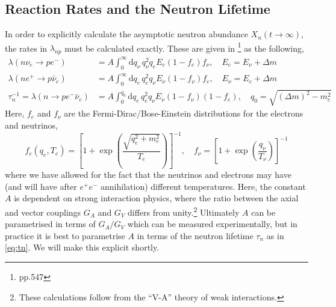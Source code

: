 \documentclass[11pt]{article}
\numberwithin{equation}{section}
\numberwithin{figure}{section}
\numberwithin{table}{section}
\begin{document}
\subsection{Reaction Rates and the Neutron Lifetime}


In order to explicitly calculate the asymptotic neutron abundance $X_n(t \rightarrow \infty)$, the rates in $\lambda_{np}$ must be calculated exactly. These are given in \citet{Weinberg:1972kfs}\footnote{pp.547} as the following,
\begin{align}
\lambda(n\nu_e \rightarrow p e^{-}) &= A \int_{0}^{\infty}{\mathrm{d}q_\nu \, q_\nu^2 q_e E_e (1 - f_e)f_\nu}, \quad E_e = E_\nu + \Delta m \\
\lambda(n e^+ \rightarrow p \bar{\nu}_e) &= A \int_{0}^{\infty}{\mathrm{d}q_e \, q_e^2 q_\nu E_\nu (1 - f_\nu)f_e}, \quad E_\nu = E_e + \Delta m \\
\tau_n^{-1} = \lambda(n \rightarrow p e^{-} \bar{\nu}_e) &= A \int_{0}^{q_0}{\mathrm{d}q_e \, q_e^2 q_\nu E_\nu (1 - f_\nu)(1 - f_e)}, \quad q_0 = \sqrt{(\Delta m)^2 - m_e^2} \label{eq:tn}
\end{align}
Here, $f_e$ and $f_\nu$ are the Fermi-Dirac/Bose-Einstein distributions for the electrons and neutrinos,
\begin{equation}
f_e(q_e, T_e) = \left[1 + \exp\left(\frac{\sqrt{q_e^2 + m_e^2}}{T_e}\right)\right]^{-1}, \quad f_\nu = \left[1 + \exp\left(\frac{q_\nu}{T_\nu}\right)\right]^{-1}
\end{equation}
where we have allowed for the fact that the neutrinos and electrons may have (and will have after $e^{+} e^{-}$ annihilation) different temperatures. Here, the constant $A$ is dependent on strong interaction physics, where the ratio between the axial and vector couplings $G_{A}$ and $G_V$ differs from unity.\footnote{These calculations follow from the ``V-A'' theory of weak interactions.} Ultimately $A$ can be parametrised in terms of $G_A/G_V$ which can be measured experimentally, but in practice it is best to parametrise $A$ in terms of the neutron lifetime $\tau_n$ as in \eqref{eq:tn}. We will make this explicit shortly.
\end{document}
